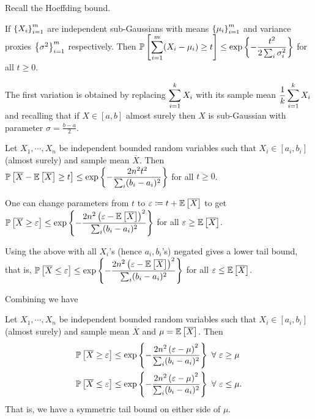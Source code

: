 Recall the Hoeffding bound.
\begin{thm}[Hoeffding]
If $\left\{X_{i}\right\}_{i=1}^{m}$ are independent sub-Gaussians with means $\left\{\mu_{i}\right\}_{i=1}^{m}$ and variance proxies $\left\{\sigma^{2}\right\}_{i=1}^{m}$ respectively. Then 
$\displaystyle\mathbb P\left[ \sum_{i=1}^{m}(X_{i}-\mu_{i}) \ge t \right] \le \exp\left\{-\frac{t^{2}}{2\sum_{i}\sigma_{i}^{2}}\right\}$ for all $t\ge 0$.
\end{thm}

The first variation is obtained by replacing $\displaystyle\sum_{i=1}^{k}X_{i}$ with its sample mean $\displaystyle\frac 1k\sum_{i=1}^{k}X_{i}$ and recalling that if $X\in[a,b]$ almost surely then $X$ is sub-Gaussian with parameter $\sigma = \frac{b-a}{2}$.

\begin{cor}\label{cor:avehoeffding}
Let $X_{1},\cdots,X_{n}$ be independent bounded random variables such that $X_{i}\in[a_{i},b_{i}]$ (almost surely) and sample mean $\overline X$. Then $\displaystyle\mathbb P\left[ \overline X - \mathbb E\left[ \overline X \right] \ge t \right] \le \exp\left\{-\frac{2n^{2}t^{2}}{\sum_{i}(b_{i}-a_{i})^{2}}\right\}$ for all $t\ge 0$.
\end{cor}

One can change parameters from $t$ to $\varepsilon \coloneqq t+\mathbb E\left[ \overline X \right]$ to get
$\displaystyle\mathbb P\left[ \overline X \ge \varepsilon \right] \le \exp\left\{-\frac{2n^{2}\left(\varepsilon-\mathbb E\left[ \overline X \right]\right)^{2}}{\sum_{i}(b_{i}-a_{i})^{2}}\right\}$ for all $\varepsilon\ge \mathbb E\left[ \overline X \right]$.

Using the above with all $X_{i}$'s (hence $a_{i},b_{i}$'s) negated gives a lower tail bound, that is, $\displaystyle\mathbb P\left[ \overline X \le \varepsilon \right] \le \exp\left\{-\frac{2n^{2}\left(\varepsilon-\mathbb E\left[ \overline X \right]\right)^{2}}{\sum_{i}(b_{i}-a_{i})^{2}}\right\}$ for all $\varepsilon\le \mathbb E\left[ \overline X \right]$.

Combining we have 
\begin{cor}\label{cor:symmtail}
Let $X_{1},\cdots,X_{n}$ be independent bounded random variables such that $X_{i}\in[a_{i},b_{i}]$ (almost surely) and sample mean $\overline X$ and $\mu = \mathbb E\left[ \overline X \right]$. Then 
\begin{align*}
\mathbb P\left[ \overline X \ge \varepsilon \right] &\le \exp\left\{-\frac{2n^{2}\left(\varepsilon-\mu\right)^{2}}{\sum_{i}(b_{i}-a_{i})^{2}}\right\} ~\forall~ \varepsilon \ge \mu\\
\mathbb P\left[ \overline X \le \varepsilon \right] &\le \exp\left\{-\frac{2n^{2}\left(\varepsilon-\mu\right)^{2}}{\sum_{i}(b_{i}-a_{i})^{2}}\right\} ~\forall~ \varepsilon \le \mu.
\end{align*}
That is, we have a symmetric tail bound on either side of $\mu$.
\end{cor}


